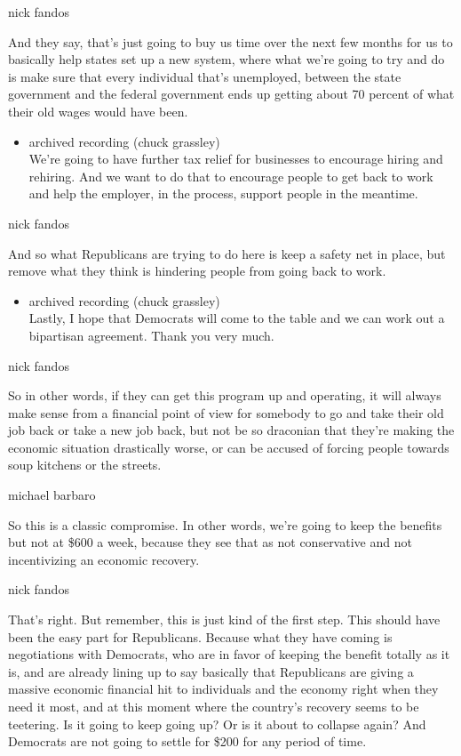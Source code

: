 nick fandos

And they say, that's just going to buy us time over the next few months
for us to basically help states set up a new system, where what we're
going to try and do is make sure that every individual that's
unemployed, between the state government and the federal government ends
up getting about 70 percent of what their old wages would have been.

\begin{itemize}
\tightlist
\item
  archived recording (chuck grassley)\\
  We're going to have further tax relief for businesses to encourage
  hiring and rehiring. And we want to do that to encourage people to get
  back to work and help the employer, in the process, support people in
  the meantime.
\end{itemize}

nick fandos

And so what Republicans are trying to do here is keep a safety net in
place, but remove what they think is hindering people from going back to
work.

\begin{itemize}
\tightlist
\item
  archived recording (chuck grassley)\\
  Lastly, I hope that Democrats will come to the table and we can work
  out a bipartisan agreement. Thank you very much.
\end{itemize}

nick fandos

So in other words, if they can get this program up and operating, it
will always make sense from a financial point of view for somebody to go
and take their old job back or take a new job back, but not be so
draconian that they're making the economic situation drastically worse,
or can be accused of forcing people towards soup kitchens or the
streets.

michael barbaro

So this is a classic compromise. In other words, we're going to keep the
benefits but not at \$600 a week, because they see that as not
conservative and not incentivizing an economic recovery.

nick fandos

That's right. But remember, this is just kind of the first step. This
should have been the easy part for Republicans. Because what they have
coming is negotiations with Democrats, who are in favor of keeping the
benefit totally as it is, and are already lining up to say basically
that Republicans are giving a massive economic financial hit to
individuals and the economy right when they need it most, and at this
moment where the country's recovery seems to be teetering. Is it going
to keep going up? Or is it about to collapse again? And Democrats are
not going to settle for \$200 for any period of time.

